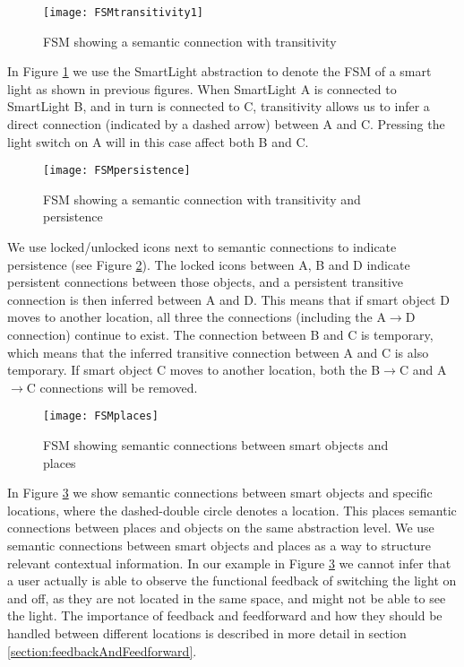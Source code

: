 \begin{figure}
\centerline{\texttt{[image: FSMtransitivity1]}}
\caption{FSM showing a semantic connection with transitivity}
\label{FSMtransitivity}
\end{figure}

In Figure \ref{FSMtransitivity} we use the SmartLight abstraction to denote the FSM of a smart light as shown in previous figures. When SmartLight A is connected to SmartLight B, and in turn is connected to C, transitivity allows us to infer a direct connection (indicated by a dashed arrow) between A and C. Pressing the light switch on A will in this case affect both B and C.

\begin{figure}
\centerline{\texttt{[image: FSMpersistence]}}
\caption{FSM showing a semantic connection with transitivity and persistence}
\label{FSMpersistence}
\end{figure}

We use locked/unlocked icons next to semantic connections to indicate persistence (see Figure \ref{FSMpersistence}). The locked icons between A, B and D indicate persistent connections between those objects, and a persistent transitive connection is then inferred between A and D. This means that if smart object D moves to another location, all three the connections (including the A$\rightarrow$D connection) continue to exist. The connection between B and C is temporary, which means that the inferred transitive connection between A and C is also temporary. If smart object C moves to another location, both the B$\rightarrow$C and A$\rightarrow$C connections will be removed.

\begin{figure}
\centerline{\texttt{[image: FSMplaces]}}
\caption{FSM showing semantic connections between smart objects and places}
\label{FSMplaces}
\end{figure}

In Figure \ref{FSMplaces} we show semantic connections between smart objects and specific locations, where the dashed-double circle denotes a location. This places semantic connections between places and objects on the same abstraction level. We use semantic connections between smart objects and places as a way to structure relevant contextual information. In our example in Figure \ref{FSMplaces} we cannot infer that a user actually is able to observe the functional feedback of switching the light on and off, as they are not located in the same space, and might not be able to see the light. The importance of feedback and feedforward and how they should be handled between different locations is described in more detail in section \ref{section:feedbackAndFeedforward}.

